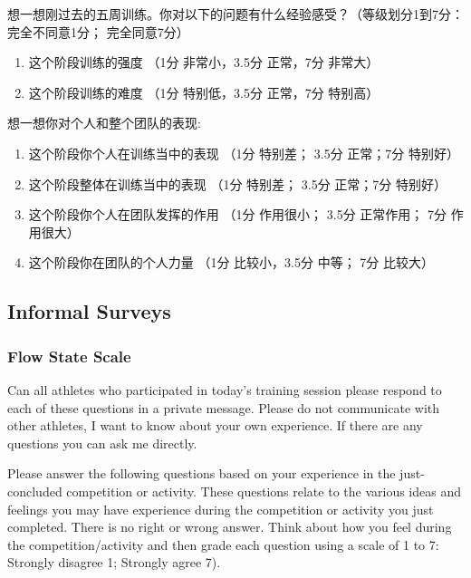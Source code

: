 \begin{CJK}{UTF8}{gbsn}
想一想刚过去的五周训练。你对以下的问题有什么经验感受？（等级划分1到7分：完全不同意1分； 完全同意7分）
\begin{enumerate}
  \item 这个阶段训练的强度 （1分 非常小，3.5分 正常，7分 非常大）
  \item 这个阶段训练的难度 （1分 特别低，3.5分 正常，7分 特别高）
\end{enumerate}

想一想你对个人和整个团队的表现:

\begin{enumerate}
  \item 这个阶段你个人在训练当中的表现 （1分 特别差； 3.5分 正常；7分 特别好）
  \item 这个阶段整体在训练当中的表现 （1分 特别差； 3.5分 正常；7分 特别好）
  \item 这个阶段你个人在团队发挥的作用 （1分 作用很小； 3.5分 正常作用； 7分 作用很大）
  \item 这个阶段你在团队的个人力量 （1分 比较小，3.5分 中等； 7分 比较大）
\end{enumerate}





\subsection{Informal Surveys}

      \subsubsection{Flow State Scale\label{sect:flowStateScale}}

Can all athletes who participated in today's training session please respond to each of these questions in a private message. Please do not communicate with other athletes, I want to know about your own experience.  If there are any questions you can ask me directly.

Please answer the following questions based on your experience in the just-concluded competition or activity. These questions relate to the various ideas and feelings you may have experience during the competition or activity you just completed. There is no right or wrong answer. Think about how you feel during the competition/activity and then grade each question using a scale of 1 to 7: Strongly disagree 1; Strongly agree 7).



\end{CJK}
